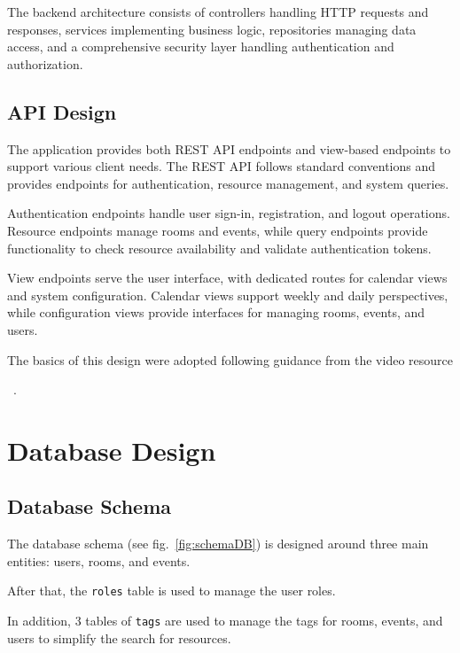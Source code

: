 The backend architecture consists of controllers handling HTTP requests and responses, services implementing business logic, repositories managing data access, and a comprehensive security layer handling authentication and authorization.

\subsection{API Design}\label{subsec:api-design}

The application provides both REST API endpoints and view-based endpoints to support various client needs.
The REST API follows standard conventions and provides endpoints for authentication, resource management, and system queries.

Authentication endpoints handle user sign-in, registration, and logout operations.
Resource endpoints manage rooms and events, while query endpoints provide functionality to check resource availability and validate authentication tokens.

View endpoints serve the user interface, with dedicated routes for calendar views and system configuration.
Calendar views support weekly and daily perspectives, while configuration views provide interfaces for managing rooms, events, and users.

The basics of this design were adopted following guidance from the video resource

~\cite{VisualComputerScience2023}.


\section{Database Design}\label{sec:database-design}

\subsection{Database Schema}\label{subsec:database-schema}
The database schema (see fig.~\ref{fig:schemaDB}) is designed around three main entities: users, rooms, and events.

After that, the \texttt{roles} table is used to manage the user roles.

In addition, 3 tables of \texttt{tags} are used to manage the tags for rooms, events, and users to simplify the search for resources.

